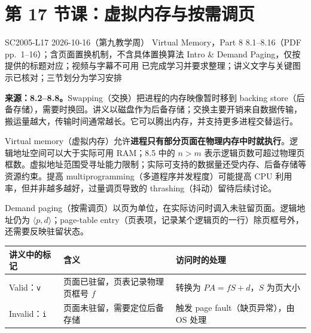 
\begingroup
\renewcommand{\recordid}[1]{}
\renewcommand{\relatedexercise}[2]{\hyperref[exercise:#1]{#2}}
\section{第 17 节课：虚拟内存与按需调页}
\label{lecture:SC2005-L17}

\lecturemeta
  {SC2005-L17}
  {2026-10-16（第九教学周）}
  {Virtual Memory，Part 8}
  {8.1--8.16（PDF pp.~1--16）；含页面置换机制，不含具体置换算法}
  {Intro \& Demand Paging，仅按提供的标题对应；视频与字幕不可用}
  {已完成学习并要求整理；讲义文字与关键图示已核对；三节划分为学习安排}



\textbf{来源：8.2--8.8。}Swapping（交换）把进程的内存映像暂时移到 backing store（后备存储），需要时换回。讲义以磁盘作为后备存储；交换主要开销来自数据传输，搬运量越大，传输时间通常越长。它可以腾出内存，并支持更多进程交替运行。

Virtual memory（虚拟内存）允许\textbf{进程只有部分页面在物理内存中时就执行}。逻辑地址空间可以大于实际可用 RAM；8.5 中的 $n>m$ 表示逻辑页数可超过物理页框数。虚拟地址范围受寻址能力限制；实际可支持的数据量还受内存、后备存储等资源约束。提高 multiprogramming（多道程序并发程度）可能提高 CPU 利用率，但并非越多越好，过量调页导致的 thrashing（抖动）留待后续讨论。

Demand paging（按需调页）以页为单位，在实际访问时调入未驻留页面。逻辑地址仍为 $\langle p,d\rangle$；page-table entry（页表项，记录某个逻辑页的一行）除页框号外，还需要反映驻留状态。
\begin{center}
\begin{tabularx}{\textwidth}{@{}l>{\raggedright\arraybackslash}X>{\raggedright\arraybackslash}X@{}}
\toprule
讲义中的标记 & 含义 & 访问时的处理 \\
\midrule
Valid：\texttt{v} & 页面已驻留，页表记录物理页框号 $f$ & 转换为 $PA=fS+d$，$S$ 为页大小 \\
Invalid：\texttt{i} & 页面未驻留，需要定位后备存储 & 触发 page fault（缺页异常），由 OS 处理 \\
\bottomrule
\end{tabularx}
\end{center}

